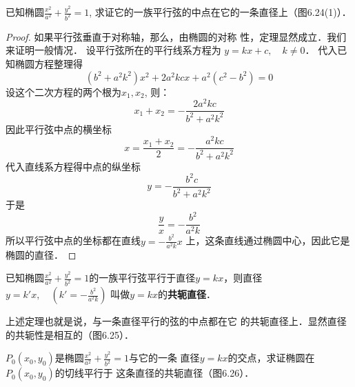 已知椭圆$\frac{x^2}{a^2}+\frac{y^2}{b^2}=1$, 求证它的一族平行弦的中点在它的一条直径上（图6.24(1)）．

\begin{proof}
    如果平行弦垂直于对称轴，那么，由椭圆的对称
性，定理显然成立．我们来证明一般情况．
设平行弦所在的平行线系方程为
$y=kx+c,\quad k\ne 0$．
代入已知椭圆方程整理得
\[(b^2+a^2k^2)x^2+2a^2kcx+a^2(c^2-b^2)=0\]
设这个二次方程的两个根为$x_1,x_2$, 则：
\[x_1+x_2=-\frac{2a^2kc}{b^2+a^2k^2}\]
因此平行弦中点的横坐标
\[x=\frac{x_1+x_2}{2}=-\frac{a^2kc}{b^2+a^2k^2}\]
代入直线系方程得中点的纵坐标
\[y=-\frac{b^2c}{b^2+a^2k^2}\]
于是
\[\frac{y}{x}=-\frac{b^2}{a^2k}\]
所以平行弦中点的坐标都在直线$y=-\frac{b^2}{a^2k}x$
上，这条直线通过椭圆中心，因此它是椭圆的直径．
\end{proof}

已知椭圆$\frac{x^2}{a^2}+\frac{y^2}{b^2}=1$的一族平行弦平行于直径$y=kx$，则直径$y=k'x,\quad \left(k'=-\frac{b^2}{a^2k}\right)$
叫做$y=kx$的\textbf{共轭直径}．

上述定理也就是说，与一条直径平行的弦的中点都在它
的共轭直径上．显然直径的共轭性是相互的（图6.25）．

\begin{figure}[htp]\centering
    \begin{minipage}[t]{0.48\textwidth}
    \centering
{}
    \caption{}
    \end{minipage}
    \begin{minipage}[t]{0.48\textwidth}
    \centering
    \caption{}
    \end{minipage}
    \end{figure}

\begin{example}
    $P_0(x_0,y_0)$是椭圆$\frac{x^2}{a^2}+\frac{y^2}{b^2}=1$与它的一条
直径$y=kx$的交点，求证椭圆在$P_0(x_0,y_0)$的切线平行于
这条直径的共轭直径（图6.26）．
\end{example}

